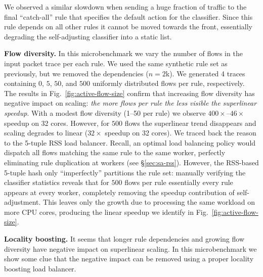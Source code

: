We observed a similar slowdown when sending a huge fraction of traffic to the final ``catch-all'' rule that specifies the default action for the classifier. Since this rule depends on all other rules it cannot be moved towards the front, essentially degrading the self-adjusting classifier into a static list.

\noindent
\textbf{Flow diversity.} %
In this microbenchmark we vary the number of flows in the input packet trace per each rule. We used the same synthetic rule set as previously, but we removed the dependencies ($n=2$k). We generated 4 traces containing $0$, $5$, $50$, and $500$ uniformly distributed flows per rule, respectively. The results in Fig.~\ref{fig:active-flow-size} confirm that increasing flow diversity has negative impact on scaling: \emph{the more flows per rule the less visible the superlinear speedup}. With a modest flow diversity (1--50 per rule) we observe $400\times$--$46\times$ speedup on 32 cores. However, for $500$ flows the superlinear trend disappears and scaling degrades to linear ($32\times$ speedup on 32 cores).  We traced back the reason to the 5-tuple RSS load balancer. Recall, an optimal load balancing policy would dispatch all flows matching the same rule to the same worker, perfectly eliminating rule duplication at workers (see \S\ref{sec:sa-rss}). However, the RSS-based 5-tuple hash only ``imperfectly'' partitions the rule set: manually verifying the classifier statistics reveals that for $500$ flows per rule essentially every rule appears at every worker, completely removing the speedup contribution of self-adjustment. This leaves only the growth due to processing the same workload on more CPU cores, producing the linear speedup we identify in Fig.~\ref{fig:active-flow-size}.

\noindent%
\textbf{Locality boosting.} %
It seems that longer rule dependencies and growing flow diversity have negative impact on superlinear scaling. In this microbenchmark we show some clue that the negative impact can be removed using a proper locality boosting load balancer.

